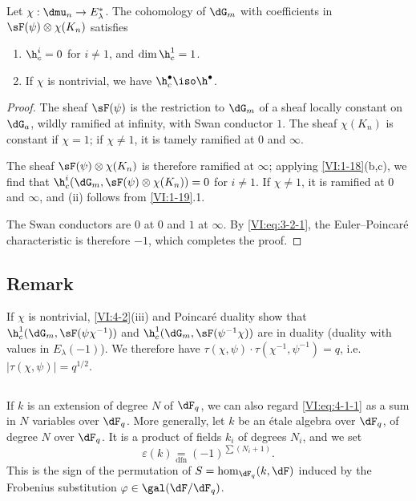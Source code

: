 \begin{proposition_}\label{VI:4-3}
Let $\chi:\dmu_n \to E_\lambda^\ast$. The cohomology of $\dG_m$ with 
coefficients in $\sF(\psi)\otimes \chi(K_n)$ satisfies 
\begin{enumerate}[\indent (i)]
  \item $\h_c^i=0$ for $i\ne 1$, and $\dim \h_c^1{} = 1$. 
  \item If $\chi$ is nontrivial, we have $\h_c^\bullet{}\iso \h^\bullet{}$. 
\end{enumerate}
\end{proposition_}
\begin{proof}[Proof]
The sheaf $\sF(\psi)$ is the restriction to $\dG_m$ of a sheaf locally 
constant on $\dG_a$, wildly ramified at infinity, with Swan conductor 
$1$. The sheaf $\chi(K_n)$ is constant if $\chi=1$; if $\chi\ne 1$, it 
is tamely ramified at $0$ and $\infty$. 

The sheaf $\sF(\psi)\otimes\chi(K_n)$ is therefore ramified at $\infty$; 
applying \ref{VI:1-18}(b,c), we find that 
$\h_c^i(\dG_m,\sF(\psi)\otimes \chi(K_n))=0$ for $i\ne 1$. If $\chi\ne 1$, it 
is ramified at $0$ and $\infty$, and (ii) follows from \ref{VI:1-19}.1. 

The Swan conductors are $0$ at $0$ and $1$ at $\infty$. By 
\eqref{VI:eq:3-2-1}, the Euler--Poincaré characteristic is therefore $-1$, 
which completes the proof. 
\end{proof}





\subsection{Remark}\label{VI:4-4}

If $\chi$ is nontrivial, \ref{VI:4-2}(iii) and Poincaré duality 
show that $\h_c^1(\dG_m,\sF(\psi\chi^{-1}))$ and 
$\h_c^1(\dG_m,\sF(\psi^{-1}\chi))$ are in duality (duality with values 
in $E_\lambda(-1)$). We therefore have 
$\tau(\chi,\psi)\cdot \tau(\chi^{-1},\psi^{-1}) = q$, i.e. 
$|\tau(\chi,\psi)|=q^{1/2}$. 





\subsection{}\label{VI:4-5}

If $k$ is an extension of degree $N$ of $\dF_q$, we can also regard 
\eqref{VI:eq:4-1-1} as a sum in $N$ variables over $\dF_q$. More 
generally, let $k$ be an étale algebra over $\dF_q$, of degree $N$ over 
$\dF_q$. It is a product of fields $k_i$ of degrees $N_i$, and we set 
\begin{equation*}\tag{4.5.1}\label{VI:eq:4-5-1}
  \varepsilon(k) \underset{\mathrm{dfn}}{=} (-1)^{\sum (N_i+1)} \text{.} 
\end{equation*}
This is the sign of the permutation of $S=\hom_{\dF_q}(k,\dF)$ induced by the 
Frobenius substitution $\varphi\in \gal(\dF/\dF_q)$. 

